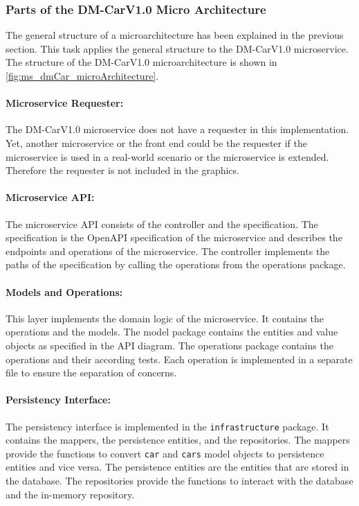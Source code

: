 \subsubsection*{Parts of the DM-CarV1.0 Micro Architecture}
The general structure of a microarchitecture has been explained in the previous section.
This task applies the general structure to the DM-CarV1.0 microservice.
The structure of the DM-CarV1.0 microarchitecture is shown in \autoref{fig:ms_dmCar_microArchitecture}.

\paragraph*{Microservice Requester:}
The DM-CarV1.0 microservice does not have a requester in this implementation.
Yet, another microservice or the front end could be the requester if the microservice is used in a real-world scenario or the microservice is extended.
Therefore the requester is not included in the graphics.

\paragraph*{Microservice API:}
The microservice API consists of the controller and the specification.
The specification is the OpenAPI specification of the microservice and describes the endpoints and operations of the microservice.
The controller implements the paths of the specification by calling the operations from the operations package.

\paragraph*{Models and Operations:}
This layer implements the domain logic of the microservice.
It contains the operations and the models.
The model package contains the entities and value objects as specified in the API diagram.
The operations package contains the operations and their according tests.
Each operation is implemented in a separate file to ensure the separation of concerns.

\paragraph*{Persistency Interface:}
The persistency interface is implemented in the \texttt{infrastructure} package.
It contains the mappers, the persistence entities, and the repositories.
The mappers provide the functions to convert \texttt{car} and \texttt{cars} model objects to persistence entities and vice versa.
The persistence entities are the entities that are stored in the database.
The repositories provide the functions to interact with the database and the in-memory repository.

